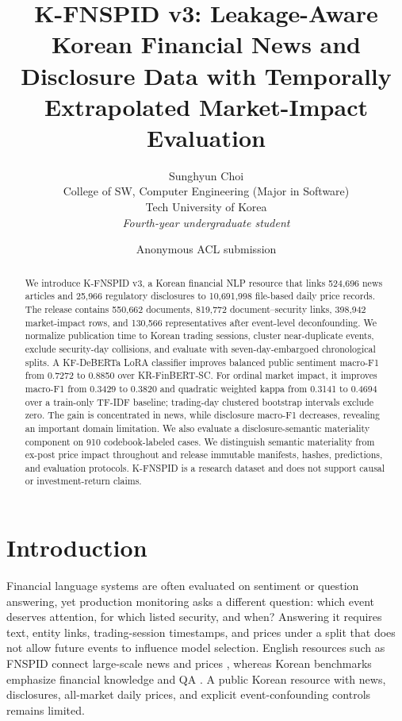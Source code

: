 \documentclass[11pt]{article}
\title{K-FNSPID v3: Leakage-Aware Korean Financial News and Disclosure Data with Temporally Extrapolated Market-Impact Evaluation}
\author{Sunghyun Choi\\
    College of SW, Computer Engineering (Major in Software)\\
    Tech University of Korea\\
    \textit{Fourth-year undergraduate student}}
\author{Anonymous ACL submission}
\begin{document}
\maketitle

\begin{abstract}
We introduce K-FNSPID v3, a Korean financial NLP resource that links 524,696 news articles and 25,966 regulatory disclosures to 10,691,998 file-based daily price records. The release contains 550,662 documents, 819,772 document--security links, 398,942 market-impact rows, and 130,566 representatives after event-level deconfounding. We normalize publication time to Korean trading sessions, cluster near-duplicate events, exclude security-day collisions, and evaluate with seven-day-embargoed chronological splits. A KF-DeBERTa LoRA classifier improves balanced public sentiment macro-F1 from 0.7272 to 0.8850 over KR-FinBERT-SC. For ordinal market impact, it improves macro-F1 from 0.3429 to 0.3820 and quadratic weighted kappa from 0.3141 to 0.4694 over a train-only TF-IDF baseline; trading-day clustered bootstrap intervals exclude zero. The gain is concentrated in news, while disclosure macro-F1 decreases, revealing an important domain limitation. We also evaluate a disclosure-semantic materiality component on 910 codebook-labeled cases. We distinguish semantic materiality from ex-post price impact throughout and release immutable manifests, hashes, predictions, and evaluation protocols. K-FNSPID is a research dataset and does not support causal or investment-return claims.
\end{abstract}

\section{Introduction}

Financial language systems are often evaluated on sentiment or question answering, yet production monitoring asks a different question: which event deserves attention, for which listed security, and when? Answering it requires text, entity links, trading-session timestamps, and prices under a split that does not allow future events to influence model selection. English resources such as FNSPID connect large-scale news and prices \citep{dong-etal-2024-fnspid}, whereas Korean benchmarks emphasize financial knowledge and QA \citep{son-etal-2024-krx,son-etal-2025-finkrx}. A public Korean resource with news, disclosures, all-market daily prices, and explicit event-confounding controls remains limited.
\end{document}
